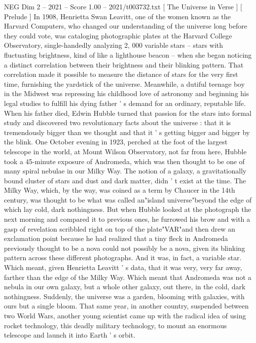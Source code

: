 \begin{textsample}{NEG Dim 2 – 2021 – Score 1.00 – 2021/t003732.txt}  \label{ex:f2_neg_069}
[ The Universe in Verse ] [ Prelude ] In 1908, Henrietta Swan Leavitt, one of the women known as the Harvard Computers, who changed our understanding of the universe long before they could vote, was cataloging photographic plates at the Harvard College Observatory, single-handedly analyzing 2, 000 variable stars -- stars with fluctuating brightness, kind of like a lighthouse beacon -- when she began noticing a distinct correlation between their brightness and their blinking pattern.
That correlation made it possible to measure the distance of stars for the very first time, furnishing the yardstick of the universe.
Meanwhile, a dutiful teenage boy in the Midwest was repressing his childhood love of astronomy and beginning his legal studies to fulfill his dying father ' s demand for an ordinary, reputable life.
When his father died, Edwin Hubble turned that passion for the stars into formal study and discovered two revolutionary facts about the universe : that it is tremendously bigger than we thought and that it ' s getting bigger and bigger by the blink.
One October evening in 1923, perched at the foot of the largest telescope in the world, at Mount Wilson Observatory, not far from here, Hubble took a 45-minute exposure of Andromeda, which was then thought to be one of many spiral nebulae in our Milky Way.
The notion of a galaxy, a gravitationally bound cluster of stars and dust and dark matter, didn ' t exist at the time.
The Milky Way, which, by the way, was coined as a term by Chaucer in the 14th century, was thought to be what was called an"island universe"beyond the edge of which lay cold, dark nothingness.
But when Hubble looked at the photograph the next morning and compared it to previous ones, he furrowed his brow and with a gasp of revelation scribbled right on top of the plate"VAR"and then drew an exclamation point because he had realized that a tiny fleck in Andromeda previously thought to be a nova could not possibly be a nova, given its blinking pattern across these different photographs.
And it was, in fact, a variable star.
Which meant, given Henrietta Leavitt ' s data, that it was very, very far away, farther than the edge of the Milky Way.
Which meant that Andromeda was not a nebula in our own galaxy, but a whole other galaxy, out there, in the cold, dark nothingness.
Suddenly, the universe was a garden, blooming with galaxies, with ours but a single bloom.
That same year, in another country, suspended between two World Wars, another young scientist came up with the radical idea of using rocket technology, this deadly military technology, to mount an enormous telescope and launch it into Earth ' s orbit.

\end{textsample}
